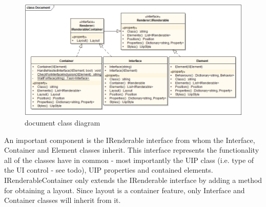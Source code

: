\begin{figure}[ht!]
\centering
\includegraphics[width=145mm]{pics/3/classDocument.png}
\caption{document class diagram}
\label{fig:classDocument}
\end{figure}

An important component is the IRenderable interface from whom the Interface, Container and Element classes inherit. This interface represents the functionality all of the classes have in common - most importantly the UIP class (i.e. type of the UI control - see todo), UIP properties and contained elements. IRenderableContainer only extends the IRenderable interface by adding a method for obtaining a layout. Since layout is a container feature, only Interface and Container classes will inherit from it.

